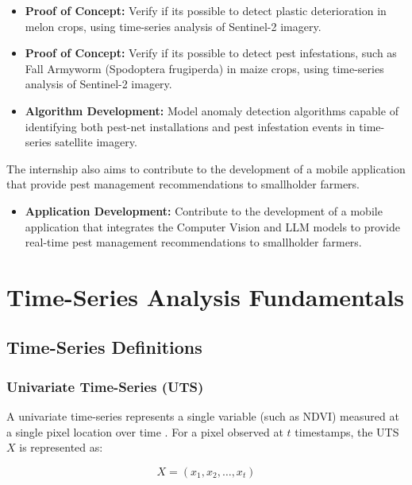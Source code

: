 \documentclass{article} %
\begin{document}
        \begin{itemize}
            \item \textbf{Proof of Concept:} Verify if its possible to detect plastic deterioration in melon crops, using time-series analysis of Sentinel-2 imagery.
            \item \textbf{Proof of Concept:} Verify if its possible to detect pest infestations, such as Fall Armyworm (Spodoptera frugiperda) in maize crops, using time-series analysis of Sentinel-2 imagery.
            \item \textbf{Algorithm Development:} Model anomaly detection algorithms capable of identifying both pest-net installations and pest infestation events in time-series satellite imagery.
        \end{itemize}

        The internship also aims to contribute to the development of a mobile application that provide pest management recommendations to smallholder farmers.

        \begin{itemize}
            \item \textbf{Application Development:} Contribute to the development of a mobile application
            that integrates the Computer Vision and LLM models to provide real-time pest management 
            recommendations to smallholder farmers.
        \end{itemize}

        \clearpage

\section{Time-Series Analysis Fundamentals}

    \subsection{Time-Series Definitions}

        \subsubsection{Univariate Time-Series (UTS)}
            A univariate time-series represents a single variable (such as NDVI) measured at a single pixel location over time \citep{zamanzadeh2024deep}. For a pixel observed at $t$ timestamps, the UTS $X$ is represented as:

            \[
            X = (x_1, x_2, \ldots, x_t)
            \]
\end{document}
